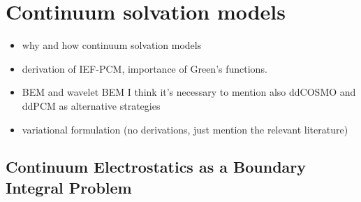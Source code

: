 \chapter{Continuum solvation models}\label{ch:CSM}

\begin{itemize}
    \item why and how continuum solvation models
    \item derivation of \acs{IEF}-\acs{PCM}, importance of Green's
      functions.
    \item \ac{BEM} and wavelet \acs{BEM} I think it's necessary to
      mention also ddCOSMO and ddPCM as alternative strategies
      ~\autocite{Cances2013-jg, Lipparini2013-cy, Lipparini2014-to,
      Lipparini2014-fq, Stamm2016-fv}
    \item variational formulation (no derivations, just mention the
      relevant literature)
\end{itemize}

\pagebreak

\section{Continuum Electrostatics as a Boundary Integral Problem}\label{sec:IEF}

